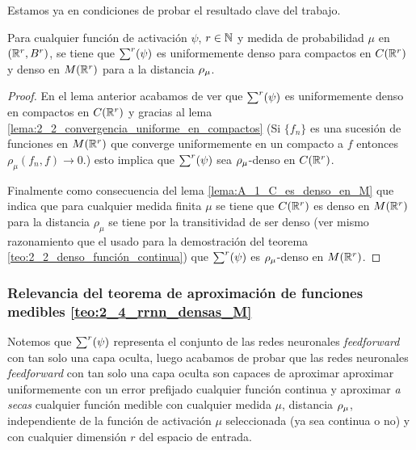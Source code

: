 Estamos ya en condiciones de probar el resultado clave del trabajo. 

\begin{teorema} \label{teo:2_4_rrnn_densas_M}
    Para cualquier función de activación $\psi$, $r \in \mathbb{N}$ y
    medida de probabilidad $\mu$ en $(\mathbb{R}^r, B^r)$, 
    se tiene que $\sum^r (\psi)$ es uniformemente denso para compactos
    en $C(\mathbb{R}^r)$ y denso en $M(\mathbb{R}^r)$ para a la distancia $\rho_{\mu}$. 
\end{teorema}
\begin{proof}
En el lema anterior 
acabamos de ver que $\sum^r (\psi)$ es uniformemente denso en compactos en $C(\mathbb{R}^r)$
y gracias al lema \ref{lema:2_2_convergencia_uniforme_en_compactos} 
(Si $\{f_n\}$ es una sucesión de funciones en $M(\mathbb{R}^r)$ que converge
uniformemente en un compacto a $f$ entonces $\rho_{\mu}(f_n, f) \longrightarrow 0$.)
esto implica 
que $\sum^r (\psi)$ sea $\rho_{\mu}$-denso en $C(\mathbb{R}^r)$. 

Finalmente como consecuencia del 
lema \ref{lema:A_1_C_es_denso_en_M}  que indica que 
para cualquier medida finita $\mu$ se tiene que $C(\mathbb{R}^r)$ es denso en 
$M(\mathbb{R}^r)$ para la distancia $\rho_\mu$
se tiene por la transitividad de ser denso (ver mismo razonamiento que el 
usado para la demostración del teorema \ref{teo:2_2_denso_función_continua})
que 
$\sum^r (\psi)$ es $\rho_{\mu}$-denso en $M(\mathbb{R}^r)$.
\end{proof}

\subsubsection{Relevancia del teorema de aproximación de funciones medibles \ref{teo:2_4_rrnn_densas_M}}

Notemos que  $\sum^r (\psi)$ representa el conjunto de 
las redes neuronales \textit{feedforward} con tan solo una capa oculta, luego 
acabamos de probar que las redes neuronales \textit{feedforward} con 
tan solo una capa oculta son capaces de aproximar 
aproximar uniformemente con un error prefijado
cualquier función continua y aproximar \textit{a secas} cualquier
función medible 
con cualquier medida $\mu$, distancia $\rho_{\mu}$, independiente de la 
función de activación $\mu$ seleccionada (ya sea continua o no) 
y con cualquier dimensión $r$ del espacio de entrada. 

 
